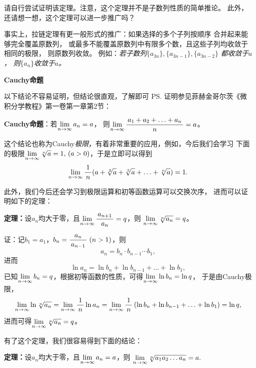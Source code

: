 请自行尝试证明该定理。注意，这个定理并不是子数列性质的简单推论。
此外，还请想一想，这个定理可以进一步推广吗？

事实上，拉链定理有更一般形式的推广：如果选择的多个子列按顺序
合并起来能够完全覆盖原数列，
或最多不能覆盖原数列中有限多个数，且这些子列均收敛于相同的极限，
则原数列收敛。
例如：{\it 若子数列$\{a_{3n}\},\{a_{3n-1}\},\{a_{3n-2}\}$
都收敛于$a$，
则$\{a_{n}\}$收敛于$a$。}

\begin{shaded}
{\bf Cauchy命题}

以下结论不容易证明，但结论很直观，了解即可
\ps{证明参见菲赫金哥尔茨《微积分学教程》第一卷第一章第2节}：
\begin{tcolorbox}
	{\bf Cauchy命题}：若$\lim\limits_{n\to\infty} a_n=a$，
	则$\lim\limits_{n\to\infty}\displaystyle\frac{\,{a_1+a_2+\ldots+a_n}\,}{\,{n}\,}=a$。
\end{tcolorbox}

这个结论也称为Cauchy{\it 极限}，有着非常重要的应用，例如，今后我们会学习
下面的极限$\lim\limits_{n\to\infty}\sqrt[n]a=1,\,(a>0)$，于是立即可以得到
$$\lim\limits_{n\to\infty}\displaystyle\frac{\,{1}\,}{\,{n}\,}(a+\sqrt[2]a+\sqrt[3]a+\ldots+\sqrt[n]a)=1.$$

\bs
此外，我们今后还会学习到极限运算和初等函数运算可以交换次序，
进而可以证明如下的定理：

\begin{tcolorbox}
	{\bf 定理：}设$a_n$均大于零，且$\lim\limits_{n\to\infty}\displaystyle\frac{\,{a_{n+1}}\,}{\,{a_n}\,}=q$，则
	$\lim\limits_{n\to\infty}\sqrt[n]{a_n}=q$。	
\end{tcolorbox}

证：记$b_1=a_1$，$b_n=\displaystyle\frac{\,{a_n}\,}{\,{a_{n-1}}\,}\;(n>1)$，则
$$a_n=b_n\cdot b_{n-1}\cdots b_1,$$
进而
$$\ln a_n=\ln b_n+\ln b_{n-1}+\ldots+\ln b_1,$$
已知$\lim\limits_{n\to\infty} b_n=q$，根据初等函数的性质，可得$\lim\limits_{n\to\infty}\ln b_n=\ln q$，
于是由Cauchy极限，
$$\lim\limits_{n\to\infty}\ln \sqrt[n]{a_n}=\lim\limits_{n\to\infty}\displaystyle\frac{\,{1}\,}{\,{n}\,}\ln a_n=\lim\limits_{n\to\infty}\displaystyle\frac{\,{1}\,}{\,{n}\,}\left(
\ln b_n+\ln b_{n-1}+\ldots+\ln b_1\right)=\ln q,$$
进而可得$\lim\limits_{n\to\infty}\sqrt[n]{a_n}=q$。\fin 

\bs
有了这个定理，我们很容易得到下面的结论：
\begin{tcolorbox}
	{\bf 定理：}设$a_n$均大于零，且$\lim\limits_{n\to\infty} a_n=a$，则
	$\lim\limits_{n\to\infty}\sqrt[n]{a_1a_2\ldots a_n}=a.$
\end{tcolorbox}
\end{shaded}

